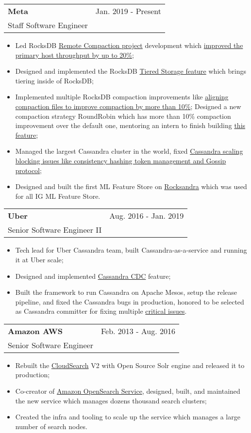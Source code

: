 \documentclass[letterpaper,11pt]{article}
\makeatletter
\newcommand{\resumeItem}[1]{
  \item{
    {#1 \vspace{-2pt}}
  }
}
\newcommand{\resumeSubheading}[4]{
  \vspace{-2pt}\item
    \begin{tabular*}{0.97\textwidth}[t]{l@{\extracolsep{\fill}}r}
      \textbf{\large#1} & {\large#2} \\
      {\large#3} & \textit{\small #4} \\
    \end{tabular*}\vspace{-10pt}
}
\newcommand{\resumeItemListStart}{\begin{itemize}}
\newcommand{\resumeItemListEnd}{\end{itemize}\vspace{-2pt}}
\makeatother
\begin{document}
    \resumeSubheading
      {Meta}{Jan. 2019 - Present}
      {Staff Software Engineer}{}
      \resumeItemListStart
        \small\resumeItem{Led RocksDB \href{https://github.com/facebook/rocksdb/wiki/Remote-Compaction-\%28Experimental\%29}{Remote Compaction project} development which \href{https://drive.google.com/file/d/1PBFwP6VFg-EQemPJaeLwIsZMq5K0kwg7/view?usp=share_link}{improved the primary host throughput by up to 20\%};}
        \resumeItem{Designed and implemented the RocksDB \href{https://rocksdb.org/blog/2022/11/09/time-aware-tiered-storage.html}{Tiered Storage feature} which brings tiering inside of RocksDB;}
        \resumeItem{Implemented multiple RocksDB compaction improvements like \href{https://rocksdb.org/blog/2022/10/31/align-compaction-output-file.html}{aligning compaction files to improve compaction by more than 10\%}; Designed a new compaction strategy RoundRobin which has more than 10\% compaction improvement over the default one, mentoring an intern to finish building \href{https://github.com/facebook/rocksdb/blob/b0d9776b704af01c2b5385e9d53754e0c8176373/include/rocksdb/advanced_options.h\#L58-L62}{this feature};}
        \resumeItem{Managed the largest Cassandra cluster in the world, fixed \href{https://github.com/ngcc/ngcc2019/blob/master/CassandraTokenManagement.pdf}{Cassandra scaling blocking issues like consistency hashing token management and Gossip protocol};}
        \resumeItem{Designed and built the first ML Feature Store on \href{https://github.com/Instagram/cassandra}{Rocksandra} which was used for all IG ML Feature Store.}
        \resumeItemListEnd

    \resumeSubheading
      {Uber}{Aug. 2016 - Jan. 2019}
      {Senior Software Engineer II}{}
      \resumeItemListStart
        \small\resumeItem{Tech lead for Uber Cassandra team, built Cassandra-as-a-service and running it at Uber scale;}
        \resumeItem{Designed and implemented \href{https://github.com/ngcc/ngcc2017/blob/master/CassandraDataIngestion.pdf}{Cassandra CDC} feature;}
        \resumeItem{Built the framework to run Cassandra on Apache Mesos, setup the release pipeline, and fixed the Cassandra bugs in production, honored to be selected as Cassandra committer for fixing multiple \href{https://issues.apache.org/jira/browse/CASSANDRA-15291?jql=assignee\%20\%3D\%20jay.zhuang}{critical issues}.}
        \resumeItemListEnd

    \resumeSubheading
      {Amazon AWS}{Feb. 2013 - Aug. 2016}
      {Senior Software Engineer}{}
      \resumeItemListStart
        \small
        \resumeItem{Rebuilt the \href{https://aws.amazon.com/cloudsearch/}{CloudSearch} V2 with Open Source Solr engine and released it to production;}
        \resumeItem{Co-creator of \href{https://aws.amazon.com/opensearch-service/}{Amazon OpenSearch Service}, designed, built, and maintained the new service which manages dozens thousand search clusters;}
        \resumeItem{Created the infra and tooling to scale up the service which manages a large number of search nodes.}
        \resumeItemListEnd
        
\end{document}
